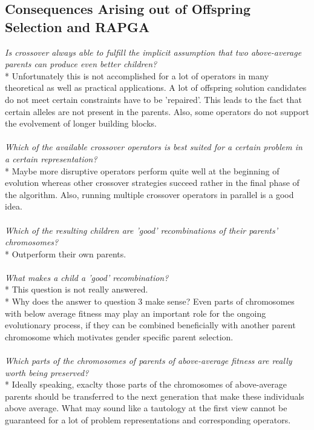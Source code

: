 \documentclass[12pt]{article}
\begin{document}
\subsection{Consequences Arising out of Offspring Selection and RAPGA}
\textit{Is crossover always able to fulfill the implicit assumption that two above-average parents can produce even better children?}\\*
Unfortunately this is not accomplished for a lot of operators in many theoretical as well as practical applications. A lot of offspring solution candidates do not meet certain constraints have to be 'repaired'. This leads to the fact that certain alleles are not present in the parents. Also, some operators do not support the evolvement of longer building blocks.\\\\
\textit{Which of the available crossover operators is best suited for a certain problem in a certain representation?}\\*
Maybe more disruptive operators perform quite well at the beginning of evolution whereas other crossover strategies succeed rather in the final phase of the algorithm. Also, running multiple crossover operators in parallel is a good idea.\\\\
\textit{Which of the resulting children are 'good' recombinations of their parents' chromosomes?}\\*
Outperform their own parents.\\\\
\textit{What makes a child a 'good' recombination?}\\*
This question is not really answered.\\*
Why does the answer to question 3 make sense? Even parts of chromosomes with below average fitness may play an important role for the ongoing evolutionary process, if they can be combined beneficially with another parent chromosome which motivates gender specific parent selection.\\\\
\textit{Which parts of the chromosomes of parents of above-average fitness are really worth being preserved?}\\*
Ideally speaking, exaclty those parts of the chromosomes of above-average parents should be transferred to the next generation that make these individuals above average. What may sound like a tautology at the first view cannot be guaranteed for a lot of problem representations and corresponding operators.
\end{document}
